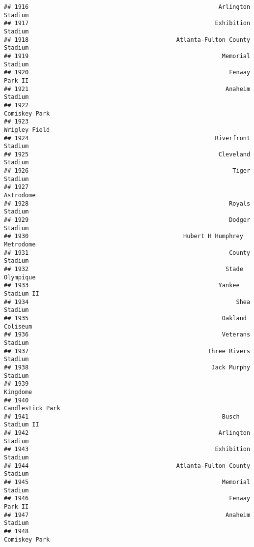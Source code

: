 \documentclass[]{article}
\begin{document}
\begin{verbatim}
## 1916                                                      Arlington Stadium
## 1917                                                     Exhibition Stadium
## 1918                                          Atlanta-Fulton County Stadium
## 1919                                                       Memorial Stadium
## 1920                                                         Fenway Park II
## 1921                                                        Anaheim Stadium
## 1922                                                          Comiskey Park
## 1923                                                          Wrigley Field
## 1924                                                     Riverfront Stadium
## 1925                                                      Cleveland Stadium
## 1926                                                          Tiger Stadium
## 1927                                                              Astrodome
## 1928                                                         Royals Stadium
## 1929                                                         Dodger Stadium
## 1930                                            Hubert H Humphrey Metrodome
## 1931                                                         County Stadium
## 1932                                                        Stade Olympique
## 1933                                                      Yankee Stadium II
## 1934                                                           Shea Stadium
## 1935                                                       Oakland Coliseum
## 1936                                                       Veterans Stadium
## 1937                                                   Three Rivers Stadium
## 1938                                                    Jack Murphy Stadium
## 1939                                                               Kingdome
## 1940                                                       Candlestick Park
## 1941                                                       Busch Stadium II
## 1942                                                      Arlington Stadium
## 1943                                                     Exhibition Stadium
## 1944                                          Atlanta-Fulton County Stadium
## 1945                                                       Memorial Stadium
## 1946                                                         Fenway Park II
## 1947                                                        Anaheim Stadium
## 1948                                                          Comiskey Park

\end{verbatim}
\end{document}
